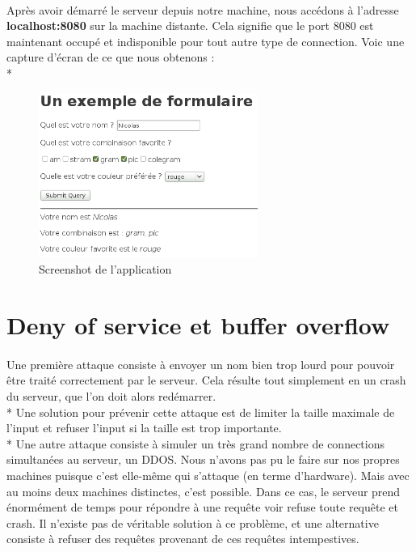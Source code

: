\documentclass{article}
\begin{document}
\paragraph{}
Apr\`{e}s avoir d\'{e}marr\'{e} le serveur depuis notre machine, nous acc\'{e}dons \`{a} l'adresse \textbf{localhost:8080} sur la machine distante. Cela signifie que le port 8080 est maintenant occup\'{e} et indisponible pour tout autre type de connection. Voic une capture d'\'{e}cran de ce que nous obtenons :
\\*
\begin{figure}[h]
\begin{center}
\includegraphics[width=0.64\textwidth]{second}
\caption{Screenshot de l'application}
\end{center}
\end{figure}
\newpage

\section{Deny of service et buffer overflow}

\paragraph{}
Une premi\`{e}re attaque consiste \`{a} envoyer un nom bien trop lourd pour pouvoir \^{e}tre trait\'{e} correctement par le serveur. Cela r\'{e}sulte tout simplement en un crash du serveur, que l'on doit alors red\'{e}marrer. \\*
Une solution pour pr\'{e}venir cette attaque est de limiter la taille maximale de l'input et refuser l'input si la taille est trop importante. \\*
Une autre attaque consiste \`{a} simuler un tr\`{e}s grand nombre de connections simultan\'{e}es au serveur, un DDOS. Nous n'avons pas pu le faire sur nos propres machines puisque c'est elle-m\^{e}me qui s'attaque (en terme d'hardware). Mais avec au moins deux machines distinctes, c'est possible. Dans ce cas, le serveur prend \'{e}norm\'{e}ment de temps pour r\'{e}pondre \`{a} une requ\^{e}te voir refuse toute requ\^{e}te et crash. Il n'existe pas de v\'{e}ritable solution \`{a} ce probl\`{e}me, et une alternative consiste \`{a} refuser des requ\^{e}tes provenant de ces requ\^{e}tes intempestives.
\end{document}
